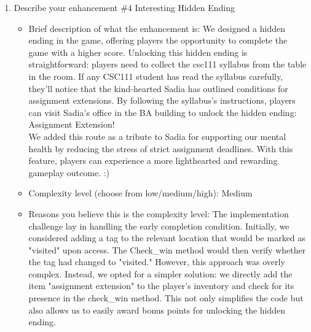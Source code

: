 \documentclass[11pt]{article}
\begin{document}
\begin{enumerate}
   \item Describe your enhancement \#4 Interesting Hidden Ending
    \begin{itemize}
        \item Brief description of what the enhancement is: We designed a hidden ending in the game, offering players the opportunity to complete the game with a higher score. Unlocking this hidden ending is straightforward: players need to collect the csc111 syllabus from the table in the room. If any CSC111 student has read the syllabus carefully, they'll notice that the kind-hearted Sadia has outlined conditions for assignment extensions. By following the syllabus's instructions, players can visit Sadia’s office in the BA building to unlock the hidden ending: Assignment Extension!\\
        We added this route as a tribute to Sadia for supporting our mental health by reducing the stress of strict assignment deadlines. With this feature, players can experience a more lighthearted and rewarding gameplay outcome. :)
        \item Complexity level (choose from low/medium/high): Medium
        \item Reasons you believe this is the complexity level: The implementation challenge lay in handling the early completion condition. Initially, we considered adding a tag to the relevant location that would be marked as "visited" upon access. The Check\_win method would then verify whether the tag had changed to "visited." However, this approach was overly complex. Instead, we opted for a simpler solution: we directly add the item "assignment extension" to the player's inventory and check for its presence in the check\_win method. This not only simplifies the code but also allows us to easily award bonus points for unlocking the hidden ending.

    \end{itemize}    


\end{enumerate}
\end{document}
